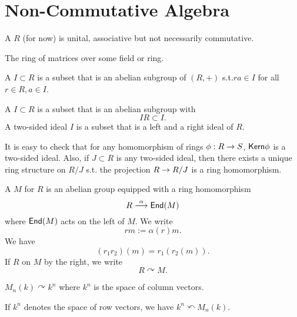 \newpage
\section{Non-Commutative Algebra}
\begin{definition}
A  $R$ (for now) is unital, associative but not necessarily commutative.
\end{definition}
\begin{example}
The ring of matrices over some field or ring.
\end{example}

\begin{definition}
A  $I \subset R$ is a subset that is an abelian subgroup of $(R,+)$ s.t.$ra \in I$ for all $r \in R, a \in I$.

A  $I\subset R$ is a subset that is an abelian subgroup with
\[ IR \subset I. \]
A two-sided ideal $I$ is a subset that is a left and a right ideal of $R$.
\end{definition}

It is easy to check that for any homomorphism of rings $\phi : R\overset{}{\rightarrow} S$, $\textsf{Kern} \phi$ is a two-sided ideal. Also, if $J \subset R$ is any two-sided ideal, then  there exists a unique ring structure on $R /J$ s.t. the projection $R \overset{}{\rightarrow} R/J$ is a ring homomorphism.

\begin{definition}
A  $M$ for $R$ is an abelian group equipped with a ring homomorphism
\[ R \overset{\alpha}{\longrightarrow} \textsf{End}(M)\]
where $\textsf{End}(M)$ acts on the left of $M$. We write
\[ rm:= \alpha(r) m. \]
We have
\[ (r_1r_2)(m) = r_1(r_2(m)). \]
If $R$  on $M$ by the right, we write
\[ R \curvearrowright M. \]
\end{definition}
\begin{example}
	$M_n(k) \curvearrowright k^n$ where $k^n$ is the space of column vectors.
	
	If $k^n$ denotes the space of row vectors, we have $k^n \curvearrowleft M_n(k)$.
\end{example}

